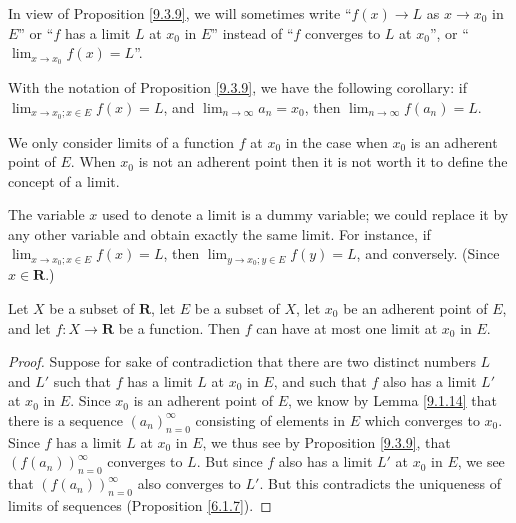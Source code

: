 \begin{note}
    In view of Proposition \ref{9.3.9}, we will sometimes write ``\(f(x) \to L\) as \(x \to x_0\) in \(E\)'' or ``\(f\) has a limit \(L\) at \(x_0\) in \(E\)'' instead of ``\(f\) converges to \(L\) at \(x_0\)'', or ``\(\lim_{x \to x_0} f(x) = L\)''.
\end{note}

\begin{remark}\label{9.3.10}
    With the notation of Proposition \ref{9.3.9}, we have the following corollary:
    if \(\lim_{x \to x_0 ; x \in E} f(x) = L\), and \(\lim_{n \to \infty} a_n = x_0\), then \(\lim_{n \to \infty} f(a_n) = L\).
\end{remark}

\begin{remark}\label{9.3.11}
    We only consider limits of a function \(f\) at \(x_0\) in the case when \(x_0\) is an adherent point of \(E\).
    When \(x_0\) is not an adherent point then it is not worth it to define the concept of a limit.
\end{remark}

\begin{remark}\label{9.3.12}
    The variable \(x\) used to denote a limit is a dummy variable;
    we could replace it by any other variable and obtain exactly the same limit.
    For instance, if \(\lim_{x \to x_0 ; x \in E} f(x) = L\), then \(\lim_{y \to x_0 ; y \in E} f(y) = L\), and conversely.
    (Since \(x \in \mathbf{R}\).)
\end{remark}

\begin{corollary}\label{9.3.13}
    Let \(X\) be a subset of \(\mathbf{R}\), let \(E\) be a subset of \(X\), let \(x_0\) be an adherent point of \(E\), and let \(f : X \to \mathbf{R}\) be a function.
    Then \(f\) can have at most one limit at \(x_0\) in \(E\).
\end{corollary}

\begin{proof}
    Suppose for sake of contradiction that there are two distinct numbers \(L\) and \(L'\) such that \(f\) has a limit \(L\) at \(x_0\) in \(E\), and such that \(f\) also has a limit \(L'\) at \(x_0\) in \(E\).
    Since \(x_0\) is an adherent point of \(E\), we know by Lemma \ref{9.1.14} that there is a sequence \((a_n)_{n = 0}^\infty\) consisting of elements in \(E\) which converges to \(x_0\).
    Since \(f\) has a limit \(L\) at \(x_0\) in \(E\), we thus see by Proposition \ref{9.3.9}, that \((f(a_n))_{n = 0}^\infty\) converges to \(L\).
    But since \(f\) also has a limit \(L'\) at \(x_0\) in \(E\), we see that \((f(a_n))_{n = 0}^\infty\) also converges to \(L'\).
    But this contradicts the uniqueness of limits of sequences (Proposition \ref{6.1.7}).
\end{proof}

